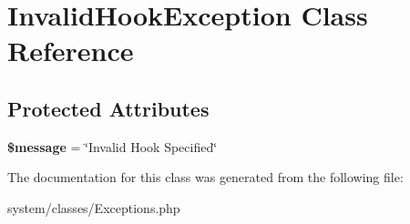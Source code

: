 \hypertarget{class_invalid_hook_exception}{
\section{InvalidHookException Class Reference}
\label{class_invalid_hook_exception}
}
\subsection*{Protected Attributes}
\begin{DoxyCompactItemize}
\item 
\hypertarget{class_invalid_hook_exception_abf17cb2dba2ed17cb28aa5f37deb5293}{
{\bfseries \$message} = \char`\"{}Invalid Hook Specified\char`\"{}}
\label{class_invalid_hook_exception_abf17cb2dba2ed17cb28aa5f37deb5293}

\end{DoxyCompactItemize}


The documentation for this class was generated from the following file:\begin{DoxyCompactItemize}
\item 
system/classes/Exceptions.php\end{DoxyCompactItemize}
